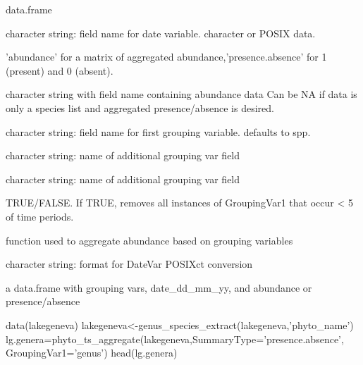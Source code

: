 \documentclass[a4paper]{book}
\begin{document}
\begin{Arguments}
\begin{ldescription}
\item[\code{phyto.data}] data.frame

\item[\code{DateVar}] character string: field name for date variable. character or POSIX data.

\item[\code{SummaryType}] 'abundance' for a matrix of aggregated abundance,'presence.absence'
for 1 (present) and 0 (absent).

\item[\code{AbundanceVar}] character string with field name containing abundance data
Can be NA if data is only a species list and aggregated presence/absence is desired.

\item[\code{GroupingVar1}] character string: field name for first grouping variable. defaults to spp.

\item[\code{GroupingVar2}] character string: name of additional grouping var field

\item[\code{GroupingVar3}] character string: name of additional grouping var field

\item[\code{remove.rare}] TRUE/FALSE. If TRUE, removes all instances of GroupingVar1 that occur < 5
of time periods.

\item[\code{fun}] function used to aggregate abundance based on grouping variables

\item[\code{format}] character string: format for DateVar POSIXct conversion
\end{ldescription}
\end{Arguments}
%
\begin{Value}
a data.frame with grouping vars, date\_dd\_mm\_yy, and abundance or presence/absence
\end{Value}
%
\begin{Examples}
\begin{ExampleCode}
data(lakegeneva)
lakegeneva<-genus_species_extract(lakegeneva,'phyto_name')
lg.genera=phyto_ts_aggregate(lakegeneva,SummaryType='presence.absence',
                             GroupingVar1='genus')
head(lg.genera)
\end{ExampleCode}
\end{Examples}
\end{document}
